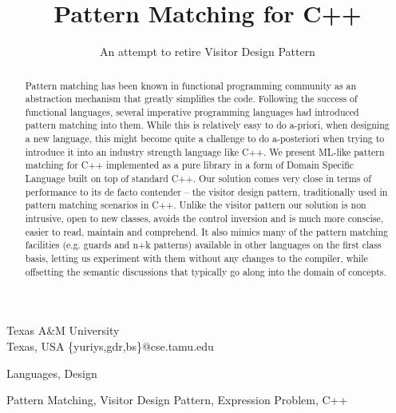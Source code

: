 \documentclass[preprint]{sigplanconf}
\begin{document}
\copyrightdata{[to be supplied]} 


\title{Pattern Matching for C++}
\subtitle{An attempt to retire Visitor Design Pattern}

           {Texas A\&M University\\ Texas, USA}
           {\{yuriys,gdr,bs\}@cse.tamu.edu}

\maketitle

\begin{abstract}
Pattern matching has been known in functional programming community as an
abstraction mechanism that greatly simplifies the code. Following the success of 
functional languages, several imperative programming languages had introduced 
pattern matching into them. While this is relatively easy to do a-priori, when 
designing a new language, this might become quite a challenge to do a-posteriori 
when trying to introduce it into an industry strength language like C++. 
We present ML-like pattern matching for C++ implemented as a pure library in a 
form of Domain Specific Language built on top of standard C++. Our solution 
comes very close in terms of performance to its de facto contender -- the visitor 
design pattern, traditionally used in pattern matching scenarios in C++. Unlike 
the visitor pattern our solution is non intrusive, open to new classes, avoids 
the control inversion and is much more conscise, easier to read, maintain and 
comprehend. It also mimics many of the pattern matching facilities (e.g. guards 
and n+k patterns) available in other languages on the first class basis, letting 
us experiment with them without any changes to the compiler, while offsetting 
the semantic discussions that typically go along into the domain of concepts.
\end{abstract}


\terms
Languages, Design

\keywords
Pattern Matching, Visitor Design Pattern, Expression Problem, C++
\end{document}
